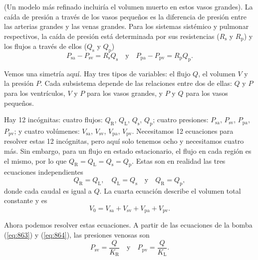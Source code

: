 \documentclass[12pt]{book}
\begin{document}
(Un modelo más refinado incluiría el volumen muerto en estos vasos grandes). La caída de presión a través de los vasos pequeños es la diferencia de presión entre las arterias grandes y las venas grandes. Para los sistemas sistémico y pulmonar respectivos, la caída de presión está determinada por sus resistencias ($R_{\text{s}}$ y $R_{\text{p}}$) y los flujos a través de ellos ($Q_{\text{s}}$ y $Q_{\text{p}}$)
\begin{equation}
P_{\text{sa}} - P_{\text{sv}} = R_{\text{s}} Q_{\text{s}} \quad \text{y} \quad P_{\text{pa}} - P_{\text{pv}} = R_{\text{p}} Q_{\text{p}}.
\label{eq:868}
\end{equation}

Vemos una simetría aquí. Hay tres tipos de variables: el flujo $Q$, el volumen $V$ y la presión $P$. Cada subsistema depende de las relaciones entre dos de ellas: $Q$ y $P$ para los ventrículos, $V$ y $P$ para los vasos grandes, y $P$ y $Q$ para los vasos pequeños.

Hay 12 incógnitas: cuatro flujos: $Q_{\text{R}}$, $Q_{\text{L}}$, $Q_{\text{s}}$, $Q_{\text{p}}$; cuatro presiones: $P_{\text{sa}}$, $P_{\text{sv}}$, $P_{\text{pa}}$, $P_{\text{pv}}$; y cuatro volúmenes: $V_{\text{sa}}$, $V_{\text{sv}}$, $V_{\text{pa}}$, $V_{\text{pv}}$. Necesitamos 12 ecuaciones para resolver estas 12 incógnitas, pero aquí solo tenemos ocho y necesitamos cuatro más. Sin embargo, para un flujo en estado estacionario, el flujo en cada región es el mismo, por lo que $Q_{\text{R}} = Q_{\text{L}} = Q_{\text{s}} = Q_{\text{p}}$. Estas son en realidad las tres ecuaciones independientes
\begin{equation}
Q_{\text{R}} = Q_{\text{L}}, \quad Q_{\text{L}} = Q_{\text{s}} \quad \text{y} \quad Q_{\text{R}} = Q_{\text{p}},
\label{eq:869}
\end{equation}
donde cada caudal es igual a $Q$. La cuarta ecuación describe el volumen total constante y es
\begin{equation}
V_0 = V_{\text{sa}} + V_{\text{sv}} + V_{\text{pa}} + V_{\text{pv}}.
\label{eq:870}
\end{equation}

Ahora podemos resolver estas ecuaciones. A partir de las ecuaciones de la bomba (\ref{eq:863}) y (\ref{eq:864}), las presiones venosas son
\begin{equation}
P_{\text{sv}} = \frac{Q}{K_{\text{R}}} \quad \text{y} \quad P_{\text{pv}} = \frac{Q}{K_{\text{L}}}.
\label{eq:871}
\end{equation}
\end{document}
